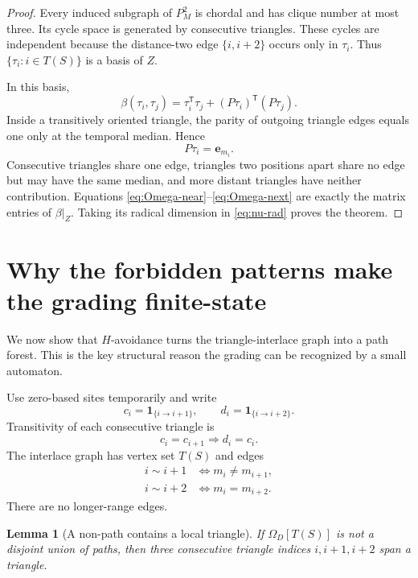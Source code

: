 \documentclass[10pt,letterpaper]{article}
\newtheorem{lemma}[theorem]{Lemma}
\newcommand{\ee}{\mathbf e}
\begin{document}
\begin{proof}
Every induced subgraph of \(P_M^2\) is chordal and has clique number at most three.  Its cycle space is generated by consecutive triangles.  These cycles are independent because the distance-two edge \(\{i,i+2\}\) occurs only in \(\tau_i\).  Thus \(\{\tau_i:i\in T(S)\}\) is a basis of \(Z\).

In this basis,
\[
 \beta(\tau_i,\tau_j)
 =\tau_i^{\mathsf T}\tau_j+(P\tau_i)^{\mathsf T}(P\tau_j).
\]
Inside a transitively oriented triangle, the parity of outgoing triangle edges equals one only at the temporal median.  Hence
\begin{equation}\label{eq:Ptau}
 P\tau_i=\ee_{m_i}.
\end{equation}
Consecutive triangles share one edge, triangles two positions apart share no edge but may have the same median, and more distant triangles have neither contribution.  Equations \eqref{eq:Omega-near}--\eqref{eq:Omega-next} are exactly the matrix entries of \(\beta|_Z\).  Taking its radical dimension in \eqref{eq:nu-rad} proves the theorem.
\end{proof}

\section{Why the forbidden patterns make the grading finite-state}\label{sec:path}

We now show that \(H\)-avoidance turns the triangle-interlace graph into a path forest.  This is the key structural reason the grading can be recognized by a small automaton.

Use zero-based sites temporarily and write
\begin{equation}\label{eq:cd-bits}
 c_i=\mathbf1_{\{i\to i+1\}},
 \qquad
 d_i=\mathbf1_{\{i\to i+2\}}.
\end{equation}
Transitivity of each consecutive triangle is
\begin{equation}\label{eq:triangle-transitivity}
 c_i=c_{i+1}\Longrightarrow d_i=c_i.
\end{equation}
The interlace graph has vertex set \(T(S)\) and edges
\begin{align}
 i\sim i+1&\Longleftrightarrow m_i\ne m_{i+1},\label{eq:interlace-1}\\
 i\sim i+2&\Longleftrightarrow m_i=m_{i+2}.
\label{eq:interlace-2}
\end{align}
There are no longer-range edges.

\begin{lemma}[A non-path contains a local triangle]\label{lem:nonpath-triangle}
If \(\Omega_D[T(S)]\) is not a disjoint union of paths, then three consecutive triangle indices \(i,i+1,i+2\) span a triangle.
\end{lemma}
\end{document}
